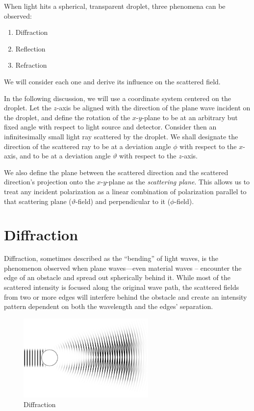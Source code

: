 \documentclass[11.5pt,oneside]{book}
\begin{document}
When light hits a spherical, transparent droplet, three phenomena can be
observed:
\begin{enumerate}
    \item Diffraction
    \item Reflection
    \item Refraction
\end{enumerate}
We will consider each one and derive its influence on the
scattered field.

In the following discussion, we will use a coordinate system centered on the
droplet. Let the $z$-axis be aligned with the direction of the plane wave
incident on the droplet, and define the rotation of the $x$-$y$-plane to be at an
arbitrary but fixed angle with respect to light source and detector. Consider
then an infinitesimally small light ray scattered by the droplet. We shall
designate the direction of the scattered ray to be at a deviation angle $\phi$ with
respect to the $x$-axis, and to be at a deviation angle $\vartheta$ with respect
to the $z$-axis.

We also define the plane between the scattered direction and the scattered
direction's projection onto the $x$-$y$-plane as the \emph{scattering plane}. This
allows us to treat any incident polarization as a linear combination of
polarization parallel to that scattering plane ($\vartheta$-field) and
perpendicular to it ($\phi$-field). 

\section{Diffraction} Diffraction, sometimes described as the ``bending'' of
light waves, is the phenomenon observed when plane waves---even material waves
-- encounter the edge of an obstacle and spread out spherically behind it. While
most of the scattered intensity is focused along the original wave path, the
scattered fields from two or more edges will interfere behind the obstacle and
create an intensity pattern dependent on both the wavelength and the edges'
separation.

\begin{figure}
\centering
\includegraphics[width=0.6\textwidth]{img/scattering/diffraction.png}
\caption{Diffraction}
\label{fig:diffraction}
\end{figure}
\end{document}
